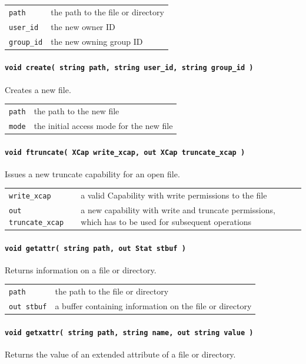 \begin{tabularx}{\textwidth}{lX}
 \texttt{path} & the path to the file or directory\\
 \texttt{user\_id} & the new owner ID\\
 \texttt{group\_id} & the new owning group ID\\
\end{tabularx}

\paragraph{\texttt{void create( string path, string user\_id, string group\_id )}}
Creates a new file.

\begin{tabularx}{\textwidth}{lX}
 \texttt{path} & the path to the new file\\
 \texttt{mode} & the initial access mode for the new file\\
\end{tabularx}

\paragraph{\texttt{void ftruncate( XCap write\_xcap, out XCap truncate\_xcap )}}
Issues a new truncate capability for an open file.

\begin{tabularx}{\textwidth}{lX}
 \texttt{write\_xcap} & a valid Capability with write permissions to the file\\
 \texttt{out truncate\_xcap} & a new capability with write and truncate permissions, which has to be used for subsequent operations\\
\end{tabularx}

\paragraph{\texttt{void getattr( string path, out Stat stbuf )}}
Returns information on a file or directory.

\begin{tabularx}{\textwidth}{lX}
 \texttt{path} & the path to the file or directory\\
 \texttt{out stbuf} & a buffer containing information on the file or directory\\
\end{tabularx}

\paragraph{\texttt{void getxattr( string path, string name, out string value )}}
Returns the value of an extended attribute of a file or directory.

